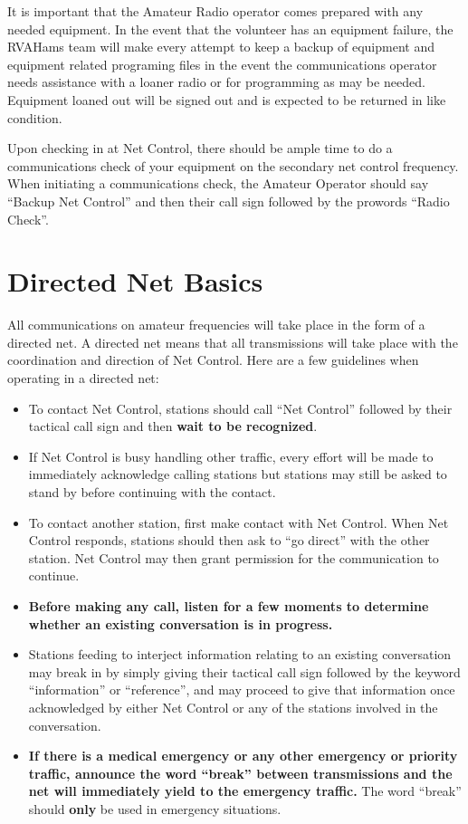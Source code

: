 \documentclass[pdflatex,letterpaper,twoside,12pt]{book}
\begin{document}
It is important that the Amateur Radio operator comes prepared with any needed equipment.  In the event that the volunteer has an equipment failure, the RVAHams team will make every attempt to keep a backup of equipment and equipment related programing files in the event the communications operator needs assistance with a loaner radio or for programming as may be needed.  Equipment loaned out will be signed out and is expected to be returned in like condition.

Upon checking in at Net Control, there should be ample time to do a communications check of your equipment on the secondary net control frequency.  When initiating a communications check, the Amateur Operator should say “Backup Net Control” and then their call sign followed by the prowords “Radio Check”.


\section{Directed Net Basics}

All communications on amateur frequencies will take place in the form of a directed net.  A directed net means that all transmissions will take place with the coordination and direction of Net Control.  Here are a few guidelines when operating in a directed net:

\begin{itemize}

	\item To contact Net Control, stations should call ``Net Control'' followed by their tactical call sign and then \textbf{wait to be recognized}.
	\item If Net Control is busy handling other traffic, every effort will be made to immediately acknowledge calling stations but stations may still be asked to stand by before continuing with the contact.
	\item To contact another station, first make contact with Net Control.  When Net Control responds, stations should then ask to ``go direct'' with the other station.  Net Control may then grant permission for the communication to continue.
	\item \textbf{Before making any call, listen for a few moments to determine whether an existing conversation is in progress.}
	\item Stations feeding to interject information relating to an existing conversation may break in by simply giving their tactical call sign followed by the keyword ``information'' or ``reference'', and may proceed to give that information once acknowledged by either Net Control or any of the stations involved in the conversation.
	\item \textbf{If there is a medical emergency or any other emergency or priority traffic, announce the word ``break'' between transmissions and the net will immediately yield to the emergency traffic.}  The word ``break'' should \textbf{only} be used in emergency situations.

\end{itemize}
\end{document}

